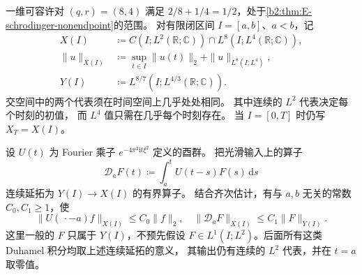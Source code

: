 一维可容许对 \((q,r)=(8,4)\) 满足
\(2/8+1/4=1/2\)，处于\cref{b2:thm:E-schrodinger-nonendpoint}的范围。
对有限闭区间 \(I=[a,b]\)、\(a<b\)，记
\[
 \begin{aligned}
 X(I)&\coloneqq C(I;L^2(\mathbb R;\mathbb C))
                   \cap L^8(I;L^4(\mathbb R;\mathbb C)),\\
 \|u\|_{X(I)}&\coloneqq\sup_{t\in I}\|u(t)\|_2
                     +\|u\|_{L^8(I;L^4)},\\
 Y(I)&\coloneqq L^{8/7}(I;L^{4/3}(\mathbb R;\mathbb C)).
 \end{aligned}
\]
交空间中的两个代表须在时间空间上几乎处处相同。
其中连续的 \(L^2\) 代表决定每个时刻的初值，
而 \(L^4\) 值只需在几乎每个时刻存在。
当 \(I=[0,T]\) 时仍写 \(X_T=X(I)\)。

设 \(U(t)\) 为 Fourier 乘子 \(e^{-4\pi^2\mathrm it\xi^2}\) 定义的酉群。
把光滑输入上的算子
\[
 \mathcal D_aF(t)\coloneqq\int_a^tU(t-s)F(s)\,\mathrm ds
\]
连续延拓为 \(Y(I)\to X(I)\) 的有界算子。
结合齐次估计，有与 \(a,b\) 无关的常数 \(C_0,C_1\ge1\)，使
\begin{equation}\label{b2:eq:E-cubic-linear-bounds}
 \|U(\,\cdot-a)f\|_{X(I)}\le C_0\|f\|_2,
 \quad \|\mathcal D_aF\|_{X(I)}\le C_1\|F\|_{Y(I)}.
\end{equation}
这里一般的 \(F\) 只属于 \(Y(I)\)，不预先假设
\(F\in L^1(I;L^2)\)。后面所有这类 Duhamel 积分均取上述连续延拓的意义，
其输出仍有连续的 \(L^2\) 代表，并在 \(t=a\) 取零值。

